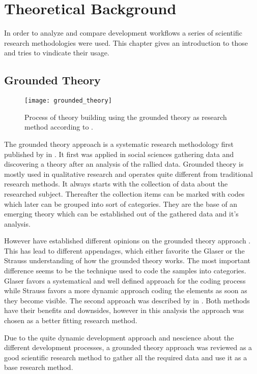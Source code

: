 \chapter{Theoretical Background} %

In order to analyze and compare development workflows a series of scientific
research methodologies were used. This chapter gives an introduction to those
and tries to vindicate their usage.

\section{Grounded Theory} %

\begin{figure}[htbp]
  \centering
  \texttt{[image: grounded\_theory]}
  \caption{Process of theory building using the grounded theory as research
    method according to \citeauthor{Strauss1990} \cite{Pandit1996}.}
\end{figure}

The grounded theory approach is a systematic research methodology first
published by \textcite{Glaser1967} in \citeyear{Glaser1967}. It first was
applied in social sciences gathering data and discovering a theory after an
analysis of the rallied data. Grounded theory is mostly used in qualitative
research and operates quite different from traditional research methods. It
always starts with the collection of data about the researched subject.
Thereafter the collection items can be marked with codes which later can be
grouped into sort of categories. They are the base of an emerging theory which
can be established out of the gathered data and it's analysis.

However \citeauthor{Glaser1967} have established different opinions on the
grounded theory approach \cite{Heath2004}. This has lead to different
appendages, which either favorite the Glaser or the Strauss understanding of
how the grounded theory works. The most important difference seems to be the
technique used to code the samples into categories. Glaser favors a
systematical and well defined approach for the coding process while Strauss
favors a more dynamic approach coding the elements as soon as they become
visible. The second approach was described by \textcite{Strauss1990} in
\citeyear{Strauss1990}. Both methods have their benefits and downsides, however
in this analysis the \citeauthor{Strauss1990} approach was chosen as a better
fitting research method.

Due to the quite dynamic development approach and nescience about the different
development processes, a grounded theory approach was reviewed as a good
scientific research method to gather all the required data and use it as a base
research method.

